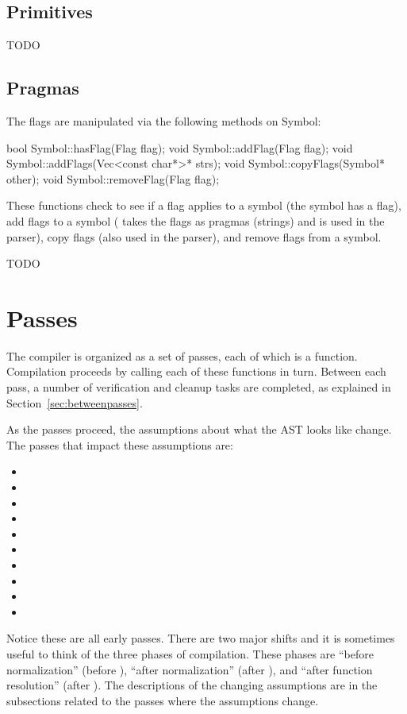 \documentclass[10pt]{article}
\begin{document}
\subsection{Primitives}
\label{sec:primitives}

TODO

\subsection{Pragmas}
\label{sec:flags}
\label{sec:pragmas}

The flags are manipulated via the following methods on Symbol:
\begin{clang}
bool Symbol::hasFlag(Flag flag);
void Symbol::addFlag(Flag flag);
void Symbol::addFlags(Vec<const char*>* strs);
void Symbol::copyFlags(Symbol* other);
void Symbol::removeFlag(Flag flag);
\end{clang}
These functions check to see if a flag applies to a symbol (the symbol
has a flag), add flags to a symbol ( takes the flags as
pragmas (strings) and is used in the parser), copy flags (also used in
the parser), and remove flags from a symbol.

TODO

\section{Passes}
\label{sec:passes}

The compiler is organized as a set of passes, each of which is a
function.  Compilation proceeds by calling each of these functions in
turn.  Between each pass, a number of verification and cleanup tasks
are completed, as explained in Section~\ref{sec:betweenpasses}.

As the passes proceed, the assumptions about what the AST looks like
change.  The passes that impact these assumptions are:
\begin{itemize}
\item {}
\item {}
\item {}
\item {}
\item {}
\item {}
\item {}
\item {}
\item {}
\item {}
\end{itemize}
Notice these are all early passes.  There are two major shifts and it
is sometimes useful to think of the three phases of compilation.
These phases are ``before normalization'' (before ),
``after normalization'' (after ), and ``after function
resolution'' (after ).  The descriptions of the changing
assumptions are in the subsections related to the passes where the
assumptions change.
\end{document}
